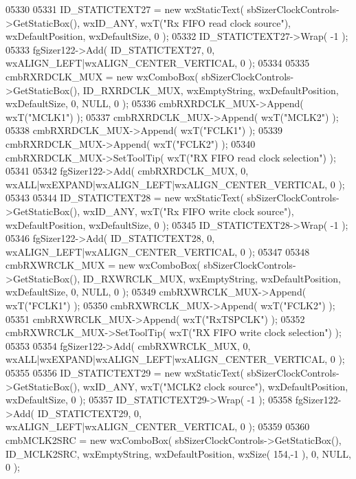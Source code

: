 \begin{DoxyCode}
05330     
05331     ID_STATICTEXT27 = \textcolor{keyword}{new} wxStaticText( sbSizerClockControls->GetStaticBox(), wxID\_ANY, wxT(\textcolor{stringliteral}{"Rx FIFO read
       clock source"}), wxDefaultPosition, wxDefaultSize, 0 );
05332     ID_STATICTEXT27->Wrap( -1 );
05333     fgSizer122->Add( ID_STATICTEXT27, 0, wxALIGN\_LEFT|wxALIGN\_CENTER\_VERTICAL, 0 );
05334     
05335     cmbRXRDCLK_MUX = \textcolor{keyword}{new} wxComboBox( sbSizerClockControls->GetStaticBox(), 
      ID_RXRDCLK_MUX, wxEmptyString, wxDefaultPosition, wxDefaultSize, 0, NULL, 0 );
05336     cmbRXRDCLK_MUX->Append( wxT(\textcolor{stringliteral}{"MCLK1"}) );
05337     cmbRXRDCLK_MUX->Append( wxT(\textcolor{stringliteral}{"MCLK2"}) );
05338     cmbRXRDCLK_MUX->Append( wxT(\textcolor{stringliteral}{"FCLK1"}) );
05339     cmbRXRDCLK_MUX->Append( wxT(\textcolor{stringliteral}{"FCLK2"}) );
05340     cmbRXRDCLK_MUX->SetToolTip( wxT(\textcolor{stringliteral}{"RX FIFO read clock selection"}) );
05341     
05342     fgSizer122->Add( cmbRXRDCLK_MUX, 0, wxALL|wxEXPAND|wxALIGN\_LEFT|wxALIGN\_CENTER\_VERTICAL, 0 );
05343     
05344     ID_STATICTEXT28 = \textcolor{keyword}{new} wxStaticText( sbSizerClockControls->GetStaticBox(), wxID\_ANY, wxT(\textcolor{stringliteral}{"Rx FIFO write
       clock source"}), wxDefaultPosition, wxDefaultSize, 0 );
05345     ID_STATICTEXT28->Wrap( -1 );
05346     fgSizer122->Add( ID_STATICTEXT28, 0, wxALIGN\_LEFT|wxALIGN\_CENTER\_VERTICAL, 0 );
05347     
05348     cmbRXWRCLK_MUX = \textcolor{keyword}{new} wxComboBox( sbSizerClockControls->GetStaticBox(), 
      ID_RXWRCLK_MUX, wxEmptyString, wxDefaultPosition, wxDefaultSize, 0, NULL, 0 );
05349     cmbRXWRCLK_MUX->Append( wxT(\textcolor{stringliteral}{"FCLK1"}) );
05350     cmbRXWRCLK_MUX->Append( wxT(\textcolor{stringliteral}{"FCLK2"}) );
05351     cmbRXWRCLK_MUX->Append( wxT(\textcolor{stringliteral}{"RxTSPCLK"}) );
05352     cmbRXWRCLK_MUX->SetToolTip( wxT(\textcolor{stringliteral}{"RX FIFO write clock selection"}) );
05353     
05354     fgSizer122->Add( cmbRXWRCLK_MUX, 0, wxALL|wxEXPAND|wxALIGN\_LEFT|wxALIGN\_CENTER\_VERTICAL, 0 );
05355     
05356     ID_STATICTEXT29 = \textcolor{keyword}{new} wxStaticText( sbSizerClockControls->GetStaticBox(), wxID\_ANY, wxT(\textcolor{stringliteral}{"MCLK2 clock
       source"}), wxDefaultPosition, wxDefaultSize, 0 );
05357     ID_STATICTEXT29->Wrap( -1 );
05358     fgSizer122->Add( ID_STATICTEXT29, 0, wxALIGN\_LEFT|wxALIGN\_CENTER\_VERTICAL, 0 );
05359     
05360     cmbMCLK2SRC = \textcolor{keyword}{new} wxComboBox( sbSizerClockControls->GetStaticBox(), 
      ID_MCLK2SRC, wxEmptyString, wxDefaultPosition, wxSize( 154,-1 ), 0, NULL, 0 );

\end{DoxyCode}
